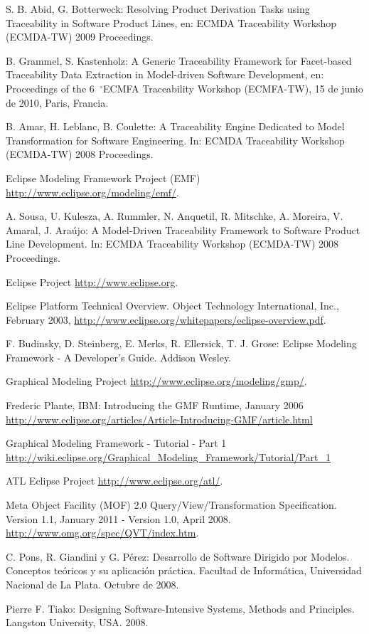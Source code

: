 \documentclass[a4paper,12pt,twoside,spanish,openright]{book}
\newcommand{\grad}{\hspace{-2mm}$\phantom{a}^{\circ}$}
\begin{document}
\begin{thebibliography}{26}
 S. B. Abid, G. Botterweck: Resolving Product Derivation Tasks using Traceability in Software Product Lines, en: ECMDA Traceability Workshop (ECMDA-TW) 2009 Proceedings.

 B. Grammel, S. Kastenholz: A Generic Traceability Framework for Facet-based Traceability Data Extraction in Model-driven Software Development, en: Proceedings of the 6\grad ECMFA Traceability Workshop (ECMFA-TW), 15 de junio de 2010, Paris, Francia.

 B. Amar, H. Leblanc, B. Coulette: A Traceability Engine Dedicated to Model Transformation for Software Engineering. In: ECMDA Traceability Workshop (ECMDA-TW) 2008 Proceedings.

 Eclipse Modeling Framework Project (EMF) \url{http://www.eclipse.org/modeling/emf/}.

 A. Sousa, U. Kulesza, A. Rummler, N. Anquetil, R. Mitschke, A. Moreira, V. Amaral, J. Araújo: A Model-Driven Traceability Framework to Software Product Line Development. In: ECMDA Traceability Workshop (ECMDA-TW) 2008 Proceedings.

 Eclipse Project \url{http://www.eclipse.org}.

 Eclipse Platform Technical Overview. Object Technology International, Inc., February 2003,
\url{http://www.eclipse.org/whitepapers/eclipse-overview.pdf}.

 F. Budinsky, D. Steinberg, E. Merks, R. Ellersick, T. J. Grose: Eclipse Modeling Framework - A Developer's Guide. Addison Wesley.

 Graphical Modeling Project \url{http://www.eclipse.org/modeling/gmp/}.

 Frederic Plante, IBM: Introducing the GMF Runtime, January 2006 \url{http://www.eclipse.org/articles/Article-Introducing-GMF/article.html}

 Graphical Modeling Framework - Tutorial - Part 1 \url{http://wiki.eclipse.org/Graphical_Modeling_Framework/Tutorial/Part_1}

 ATL Eclipse Project \url{http://www.eclipse.org/atl/}.

 Meta Object Facility (MOF) 2.0 Query/View/Transformation Specification. Version 1.1, January 2011 - Version 1.0, April 2008. \url{http://www.omg.org/spec/QVT/index.htm}.

 C. Pons, R. Giandini y G. Pérez: Desarrollo de Software Dirigido por Modelos. Conceptos teóricos y su aplicación práctica. Facultad de Informática, Universidad Nacional de La Plata. Octubre de 2008.

 Pierre F. Tiako: Designing Software-Intensive Systems, Methods and Principles. Langston University, USA. 2008.

\end{thebibliography}
\end{document}
